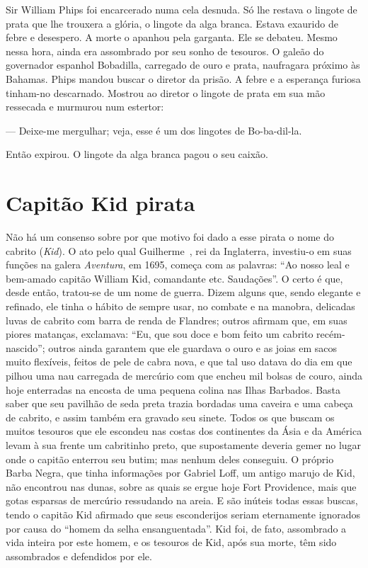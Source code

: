 Sir William Phips foi encarcerado numa cela desnuda. Só lhe restava o
lingote de prata que lhe trouxera a glória, o lingote da alga branca.
Estava exaurido de febre e desespero. A morte o apanhou pela garganta. Ele
se debateu. Mesmo nessa hora, ainda era assombrado por seu sonho de
tesouros. O galeão do governador espanhol Bobadilla, carregado de ouro e
prata, naufragara próximo às Bahamas. Phips mandou buscar o diretor da
prisão. A febre e a esperança furiosa tinham-no descarnado. Mostrou ao
diretor o lingote de prata em sua mão ressecada e murmurou num estertor:

--- Deixe-me mergulhar; veja, esse é um dos lingotes de Bo-ba-dil-la.

Então expirou. O lingote da alga branca pagou o seu caixão.

\chapter{Capitão Kid pirata}

Não há um consenso sobre por que motivo foi dado a esse pirata o nome do
cabrito (\textit{Kid}). O ato pelo qual Guilherme~, rei da Inglaterra,
investiu-o em suas funções na galera \textit{Aventura}, em 1695, começa
com as palavras: “Ao nosso leal e bem-amado capitão William Kid,
comandante etc. Saudações”. O certo é que, desde então, tratou-se de um
nome de guerra. Dizem alguns que, sendo elegante e refinado, ele tinha o
hábito de sempre usar, no combate e na manobra, delicadas luvas de cabrito
com barra de renda de Flandres; outros afirmam que, em suas piores
matanças, exclamava: “Eu, que sou doce e bom feito um cabrito
recém-nascido”; outros ainda garantem que ele guardava o ouro e as joias
em sacos muito flexíveis, feitos de pele de cabra nova, e que tal uso
datava do dia em que pilhou uma nau carregada de mercúrio com que encheu
mil bolsas de couro, ainda hoje enterradas na encosta de uma pequena
colina nas Ilhas Barbados. Basta saber que seu pavilhão de seda preta
trazia bordadas uma caveira e uma cabeça de cabrito, e assim também era
gravado seu sinete. Todos os que buscam os muitos tesouros que ele
escondeu nas costas dos continentes da Ásia e da América levam à sua
frente um cabritinho preto, que supostamente deveria gemer no lugar onde o
capitão enterrou seu butim; mas nenhum deles conseguiu. O próprio Barba
Negra, que tinha informações por Gabriel Loff, um antigo marujo de Kid,
não encontrou nas dunas, sobre as quais se ergue hoje Fort Providence,
mais que gotas esparsas de mercúrio ressudando na areia. E são inúteis
todas essas buscas, tendo o capitão Kid afirmado que seus esconderijos
seriam eternamente ignorados por causa do “homem da selha ensanguentada”.
Kid foi, de fato, assombrado a vida inteira por este homem, e os tesouros
de Kid, após sua morte, têm sido assombrados e defendidos por ele.

